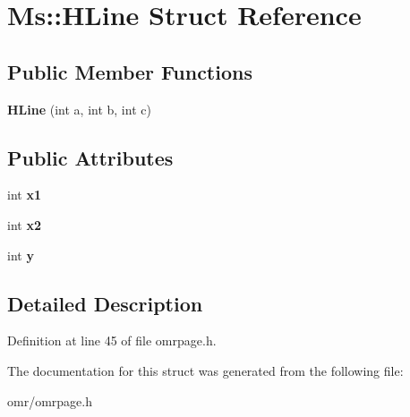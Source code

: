 \hypertarget{struct_ms_1_1_h_line}{}\section{Ms\+:\+:H\+Line Struct Reference}
\label{struct_ms_1_1_h_line}
\subsection*{Public Member Functions}
\begin{DoxyCompactItemize}
\item 
\mbox{\label{struct_ms_1_1_h_line_a95872b56bb4c61c4f27675af4d2f7951}} 
{\bfseries H\+Line} (int a, int b, int c)
\end{DoxyCompactItemize}
\subsection*{Public Attributes}
\begin{DoxyCompactItemize}
\item 
\mbox{\label{struct_ms_1_1_h_line_a2d124e71daa548da3d8759fb289f5993}} 
int {\bfseries x1}
\item 
\mbox{\label{struct_ms_1_1_h_line_a02e641c9d86cc2029e6a17f28b79e48c}} 
int {\bfseries x2}
\item 
\mbox{\label{struct_ms_1_1_h_line_ad1ce7fabc029379dc87b08ba62a65c2b}} 
int {\bfseries y}
\end{DoxyCompactItemize}


\subsection{Detailed Description}


Definition at line 45 of file omrpage.\+h.



The documentation for this struct was generated from the following file\+:\begin{DoxyCompactItemize}
\item 
omr/omrpage.\+h\end{DoxyCompactItemize}
